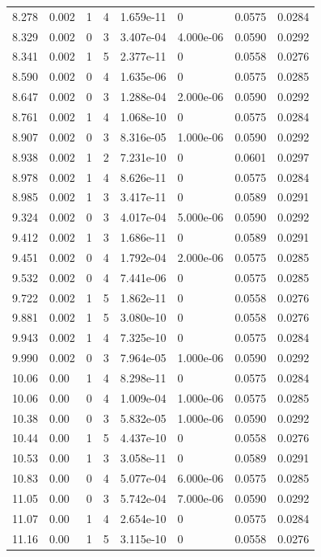 \documentclass[preview]{standalone}
\begin{document}
{{{\begin{tabular}{L{1.2cm}C{1.2cm} C{0.3cm}C{0.5cm} C{1.4cm}C{1.4cm} C{1.4cm}C{1.4cm}}
  8.278  &  0.002  & 1     &  4 &  1.659e-11  & 0  & 0.0575 &  0.0284   \\ 
  8.329  &  0.002  & 0     &  3 &  3.407e-04  & 4.000e-06  & 0.0590 &  0.0292   \\ 
  8.341  &  0.002  & 1     &  5 &  2.377e-11  & 0  & 0.0558 &  0.0276   \\ 
  8.590  &  0.002  & 0     &  4 &  1.635e-06  & 0  & 0.0575 &  0.0285   \\ 
  8.647  &  0.002  & 0     &  3 &  1.288e-04  & 2.000e-06  & 0.0590 &  0.0292   \\ 
  8.761  &  0.002  & 1     &  4 &  1.068e-10  & 0  & 0.0575 &  0.0284   \\ 
  8.907  &  0.002  & 0     &  3 &  8.316e-05  & 1.000e-06  & 0.0590 &  0.0292   \\ 
  8.938  &  0.002  & 1     &  2 &  7.231e-10  & 0  & 0.0601 &  0.0297   \\ 
  8.978  &  0.002  & 1     &  4 &  8.626e-11  & 0  & 0.0575 &  0.0284   \\ 
  8.985  &  0.002  & 1     &  3 &  3.417e-11  & 0  & 0.0589 &  0.0291   \\ 
  9.324  &  0.002  & 0     &  3 &  4.017e-04  & 5.000e-06  & 0.0590 &  0.0292   \\ 
  9.412  &  0.002  & 1     &  3 &  1.686e-11  & 0  & 0.0589 &  0.0291   \\ 
  9.451  &  0.002  & 0     &  4 &  1.792e-04  & 2.000e-06  & 0.0575 &  0.0285   \\ 
  9.532  &  0.002  & 0     &  4 &  7.441e-06  & 0  & 0.0575 &  0.0285   \\ 
  9.722  &  0.002  & 1     &  5 &  1.862e-11  & 0  & 0.0558 &  0.0276   \\ 
  9.881  &  0.002  & 1     &  5 &  3.080e-10  & 0  & 0.0558 &  0.0276   \\ 
  9.943  &  0.002  & 1     &  4 &  7.325e-10  & 0  & 0.0575 &  0.0284   \\ 
  9.990  &  0.002  & 0     &  3 &  7.964e-05  & 1.000e-06  & 0.0590 &  0.0292   \\ 
  10.06  &  0.00  & 1     &  4 &  8.298e-11  & 0  & 0.0575 &  0.0284   \\ 
  10.06  &  0.00  & 0     &  4 &  1.009e-04  & 1.000e-06  & 0.0575 &  0.0285   \\ 
  10.38  &  0.00  & 0     &  3 &  5.832e-05  & 1.000e-06  & 0.0590 &  0.0292   \\ 
  10.44  &  0.00  & 1     &  5 &  4.437e-10  & 0  & 0.0558 &  0.0276   \\ 
  10.53  &  0.00  & 1     &  3 &  3.058e-11  & 0  & 0.0589 &  0.0291   \\ 
  10.83  &  0.00  & 0     &  4 &  5.077e-04  & 6.000e-06  & 0.0575 &  0.0285   \\ 
  11.05  &  0.00  & 0     &  3 &  5.742e-04  & 7.000e-06  & 0.0590 &  0.0292   \\ 
  11.07  &  0.00  & 1     &  4 &  2.654e-10  & 0  & 0.0575 &  0.0284   \\ 
  11.16  &  0.00  & 1     &  5 &  3.115e-10  & 0  & 0.0558 &  0.0276   \\ 
\hline 
\end{tabular} 

}}}
\end{document}
